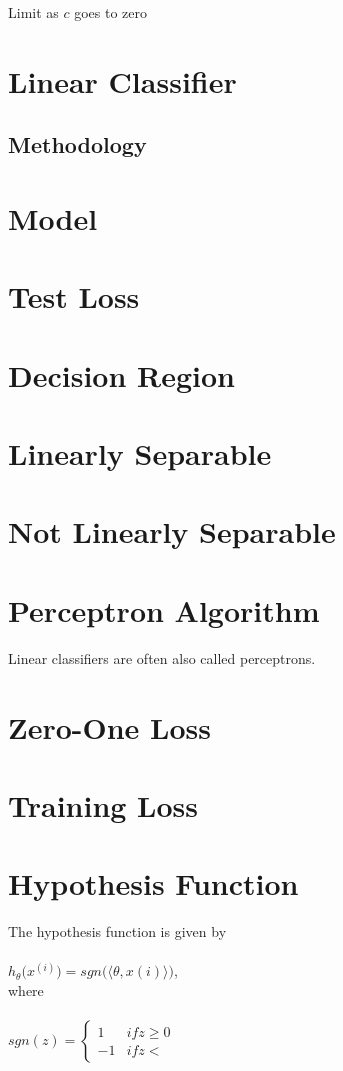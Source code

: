 \documentclass[12pt, a4paper]{article}
\begin{document}
Limit as \( c \) goes to zero

\section*{Linear Classifier}
\subsection*{Methodology}

\section*{Model}

\section*{Test Loss}

\section*{Decision Region}

\section*{Linearly Separable}

\section*{Not Linearly Separable}

\section*{Perceptron Algorithm}
Linear classifiers are often also called perceptrons.

\section*{Zero-One Loss}

\section*{Training Loss}

\section*{Hypothesis Function}
The hypothesis function is given by \\
\\
\( h_\theta\bigg(x^{(i)}\bigg) = sgn\bigg(\bigg\langle\theta,x{(i)}\bigg\rangle\bigg) \), \\
where \\
\\
\( 
  sgn(z) = {
    \begin{cases}
    1 & if z \geq 0 \\
    -1 & if z <
  \end{cases}
}  
\)
\end{document}
